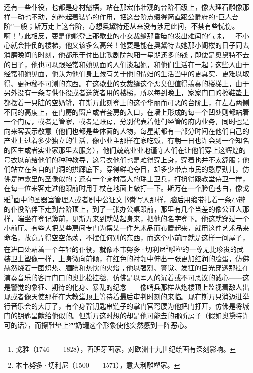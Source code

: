 \par 还有一些仆役，也都是身材魁梧，站在那宏伟壮观的台阶石级上，像大理石雕像那样一动也不动，纯粹起着装饰的作用，把这台阶点缀得简直跟公爵府的“巨人台阶”一般；斯万走上这台阶，心想奥黛特还从来没有涉足此间，不禁有些忧伤。啊！与此相反，要是他能登上那歇业的小女裁缝那昏暗的发出难闻的气味，一不小心就会摔倒的楼梯，他又该多么高兴！他要是能在奥黛特去她那小阁楼的日子同去消磨晚间的时刻，他都乐于付出比歌剧院包厢一星期还多的钱；即使是奥黛特不去的日子，他也可以跟经常和她见面的人们谈起她，和他们生活在一起；这些人由于经常和她见面，他认为他们身上藏有关于他的情妇的生活当中的更真实、更难以取得、更神秘不可测的东西。在这歇业的女裁缝这个恶臭但值得羡慕的楼梯上，由于另外没有一条专供仆役或者送货者用的楼梯，所以每到晚上，家家门口的擦鞋垫上都摆着一只脏的空奶罐，在斯万此刻登上的这个华丽而可恶的台阶上，在左右两侧不同的高度上，在门房的窗户或者套房的入口，在墙上形成的每一个凹处则都站着一个门房，或者是管家，或者是账房，分别代表着他们经管的府内业务，同时也是向来客表示敬意（他们也都是些体面的人物，每星期都有一部分时间在他们自己的产业上过着多少独立的生活，像小业主那样在家吃饭，有朝一日也许会到一个知名的医生或者实业家那里去服务），他们兢兢业业地谨守人们在让他们穿上这辉煌的号衣以前给他们的种种教导，这号衣他们也是难得穿上身，穿着也并不太舒服；他们站立在各自的门洞的拱廊底下，穿得鲜艳夺目，却多少带点市民的憨厚劲儿，仿佛是神龛里的圣像似的；还有一个身材高大的瑞士卫兵，打扮得跟教堂侍卫一样，在每一位来客走过他跟前时用手杖在地面上敲打一下。斯万在一个脸色苍白，像戈雅\footnote{戈雅（1746——1828），西班牙画家，对欧洲十九世纪绘画有深刻影响。}画中的圣器室管理人或者剧中公证文书誊写人那样，脑后用缎带扎着一条小辫的仆役陪伴下走到台阶顶上，到了一张办公桌跟前，那里有几个当差的像公证人那样，端坐在登记簿前，见斯万来到就站起身来，把他的名字登下。他这就穿过一个小前厅。有些人把某些房间专门为摆某一件艺术品而布置起来，就用这件艺术品来命名，故意弄得空空荡荡，不摆任何别的东西，而这个小前厅就是这样一间屋子，在进口处站着一个年轻的仆役，就像本韦努多·切利尼\footnote{本韦努多·切利尼（1500——1571），意大利雕塑家。}雕塑的一尊无比珍贵的武装卫士塑像一样，上身微向前倾，在红色的衬领中伸出一张更加红润的脸蛋，仿佛赫然烧着一团炽热、腼腆和热忱的火焰；他以强烈、警觉、发狂的目光穿透那挂在演奏音乐的客厅门口的奥比松挂毯，仿佛是以军人的沉着或不可思议的诚心——这是警觉的象征、期待的化身、暴乱的纪念——像哨兵那样从炮楼顶上监视着敌人出现或者像天使那样在大教堂顶上等待着最后审判时刻的来临。现在斯万只消迈进举行音乐会的大厅了，有个身背钥匙串链子的掌门官弯腰为他把门打开，仿佛是将城门的钥匙呈献给他似的。但斯万这时想的却是他可能去的那所房子（假如奥黛特许可的话），而擦鞋垫上空奶罐这个形象使他突然感到一阵恶心。
